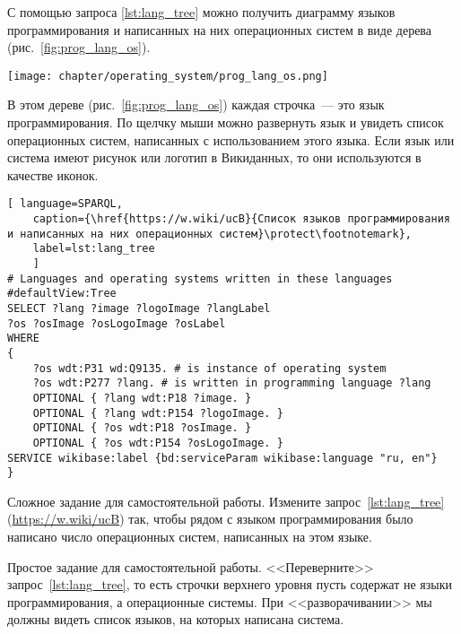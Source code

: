 \newpage
С помощью запроса \ref{lst:lang_tree} можно получить диаграмму языков программирования 
и написанных на них операционных систем в виде дерева (рис.~\ref{fig:prog_lang_os}).

\begin{marginfigure}[0.0cm]
    \texttt{[image: chapter/operating\_system/prog\_lang\_os.png]}
    \caption[Дерево языков программирования и написанных на них ОС.]{Дерево языков программирования и написанных на них операционных систем.}
	\label{fig:prog_lang_os}%
\end{marginfigure}

В этом дереве (рис.~\ref{fig:prog_lang_os}) каждая строчка~--- это язык программирования. 
По щелчку мыши можно развернуть язык и увидеть список операционных систем, 
написанных с использованием этого языка. 
Если язык или система имеют рисунок или логотип в Викиданных, 
то они используются в качестве иконок.


\begin{lstlisting}[ language=SPARQL, 
	caption={\href{https://w.wiki/ucB}{Список языков программирования и написанных на них операционных систем}\protect\footnotemark},
	label=lst:lang_tree
	]
# Languages and operating systems written in these languages
#defaultView:Tree
SELECT ?lang ?image ?logoImage ?langLabel 
?os ?osImage ?osLogoImage ?osLabel 
WHERE 
{
	?os wdt:P31 wd:Q9135. # is instance of operating system
	?os wdt:P277 ?lang. # is written in programming language ?lang
	OPTIONAL { ?lang wdt:P18 ?image. }
	OPTIONAL { ?lang wdt:P154 ?logoImage. }
	OPTIONAL { ?os wdt:P18 ?osImage. }
	OPTIONAL { ?os wdt:P154 ?osLogoImage. }
SERVICE wikibase:label {bd:serviceParam wikibase:language "ru, en"}
}
\end{lstlisting}

Сложное задание для самостоятельной работы. Измените запрос~\ref{lst:lang_tree} (\href{https://w.wiki/ucB}{https://w.wiki/ucB}) так, чтобы рядом с языком программирования было написано число операционных систем, написанных на этом языке.


Простое задание для самостоятельной работы. <<Переверните>> запрос~\ref{lst:lang_tree}, то есть строчки верхнего уровня пусть содержат не языки программирования, а операционные системы. При <<разворачивании>> мы должны видеть список языков, на которых написана система.









